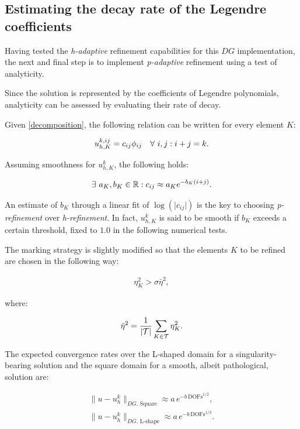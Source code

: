 \subsection{Estimating the decay rate of the Legendre coefficients}

Having tested the \textit{h-adaptive} refinement capabilities for this $DG$ implementation, the next and final step is to implement \textit{p-adaptive} refinement using a test of analyticity.

\cite{Eibner2007} Since the solution is represented by the coefficients of Legendre polynomials, analyticity can be assessed by evaluating their rate of decay.

Given \eqref{decomposition}, the following relation can be written for every element $K$:

\begin{gather}
    u^{k, ij}_{h, K} = c_{ij} \phi_{ij} \quad \forall ~ i, j : i + j = k.
\end{gather}

Assuming smoothness for $u^k_{h, K}$, the following holds:

\begin{gather}
    \exists ~ a_K, b_K \in \mathbb{R} : c_{ij} \approx a_K e^{-b_K (i + j)}.
\end{gather}

An estimate of $b_K$ through a linear fit of $\log(\lvert c_{ij} \rvert)$ is the key to choosing \textit{p-refinement} over \textit{h-refinement}. In fact, $u^k_{h, K}$ is said to be smooth if $b_K$ exceeds a certain threshold, fixed to $1.0$ in the following numerical tests.

The marking strategy is slightly modified so that the elements $K$ to be refined are chosen in the following way:

\begin{gather}
    \eta_K^2 > \sigma \bar{\eta}^2,
\end{gather}

where:

\begin{gather}
    \bar{\eta}^2 = \frac{1}{\lvert \mathcal{T} \rvert} \sum_{K \in \mathcal{T}} \eta_K^2.
\end{gather}

\cite{Eibner2007} The expected convergence rates over the L-shaped domain for a singularity-bearing solution and the square domain for a smooth, albeit pathological, solution are:

\begin{gather} 
    \lVert u - u^k_h \rVert_{DG, \, \text{Square}} \approx a \, e^{-b \, \text{DOFs}^{1/2}}, \label{square-hp} \\
    \lVert u - u^k_h \rVert_{DG, \, \text{L-shape}} \approx a \, e^{-b \, \text{DOFs}^{1/3}}. \label{lshape-hp}
\end{gather}

